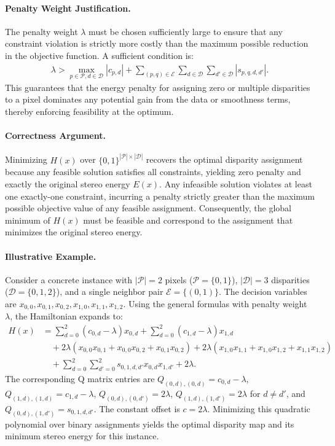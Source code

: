 \documentclass[12pt]{article}
\begin{document}
\paragraph{Penalty Weight Justification.}
The penalty weight $\lambda$ must be chosen sufficiently large to ensure that any constraint violation is strictly more costly than the maximum possible reduction in the objective function. A sufficient condition is:
\begin{align}
    \lambda > \max_{p \in \mathcal{P}, d \in \mathcal{D}} |c_{p,d}| + \sum_{(p,q) \in \mathcal{E}} \sum_{d \in \mathcal{D}} \sum_{d' \in \mathcal{D}} |s_{p,q,d,d'}|.
\end{align}
This guarantees that the energy penalty for assigning zero or multiple disparities to a pixel dominates any potential gain from the data or smoothness terms, thereby enforcing feasibility at the optimum.

\paragraph{Correctness Argument.}
Minimizing $H(x)$ over $\{0,1\}^{|\mathcal{P}| \times |\mathcal{D}|}$ recovers the optimal disparity assignment because any feasible solution satisfies all constraints, yielding zero penalty and exactly the original stereo energy $E(x)$. Any infeasible solution violates at least one exactly-one constraint, incurring a penalty strictly greater than the maximum possible objective value of any feasible assignment. Consequently, the global minimum of $H(x)$ must be feasible and correspond to the assignment that minimizes the original stereo energy.

\paragraph{Illustrative Example.}
Consider a concrete instance with $|\mathcal{P}| = 2$ pixels ($\mathcal{P} = \{0,1\}$), $|\mathcal{D}| = 3$ disparities ($\mathcal{D} = \{0,1,2\}$), and a single neighbor pair $\mathcal{E} = \{(0,1)\}$. The decision variables are $x_{0,0}, x_{0,1}, x_{0,2}, x_{1,0}, x_{1,1}, x_{1,2}$. Using the general formulas with penalty weight $\lambda$, the Hamiltonian expands to:
\begin{align}
    H(x) &= \sum_{d=0}^{2} (c_{0,d} - \lambda) x_{0,d} + \sum_{d=0}^{2} (c_{1,d} - \lambda) x_{1,d} \nonumber \\
    &\quad + 2\lambda (x_{0,0}x_{0,1} + x_{0,0}x_{0,2} + x_{0,1}x_{0,2}) + 2\lambda (x_{1,0}x_{1,1} + x_{1,0}x_{1,2} + x_{1,1}x_{1,2}) \nonumber \\
    &\quad + \sum_{d=0}^{2} \sum_{d'=0}^{2} s_{0,1,d,d'} x_{0,d} x_{1,d'} + 2\lambda.
\end{align}
The corresponding Q matrix entries are $Q_{(0,d),(0,d)} = c_{0,d} - \lambda$, $Q_{(1,d),(1,d)} = c_{1,d} - \lambda$, $Q_{(0,d),(0,d')} = 2\lambda$, $Q_{(1,d),(1,d')} = 2\lambda$ for $d \neq d'$, and $Q_{(0,d),(1,d')} = s_{0,1,d,d'}$. The constant offset is $c = 2\lambda$. Minimizing this quadratic polynomial over binary assignments yields the optimal disparity map and its minimum stereo energy for this instance.
\end{document}
